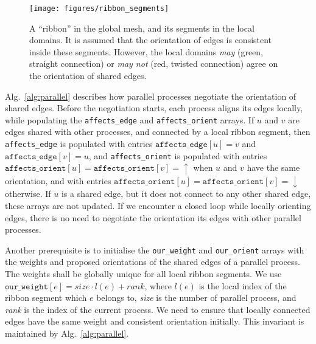 \documentclass[oneeqnum,onethmnum,onefignum,onetabnum]{siamltex1213}
\begin{document}
\begin{figure}
  \centering
  \texttt{[image: figures/ribbon\_segments]}

  \caption{A ``ribbon'' in the global mesh, and its segments in the
    local domains. It is assumed that the orientation of edges is
    consistent inside these segments. However, the local domains
    \emph{may} (green, straight connection) or \emph{may not}
    (red, twisted connection) agree on the
    orientation of shared edges.}
  \label{fig:ribbon_segments}
\end{figure}

Alg.~\ref{alg:parallel} describes how parallel processes negotiate the
orientation of shared edges. Before the negotiation starts, each
process aligns its edges locally, while populating the
\texttt{affects\_edge} and \texttt{affects\_orient} arrays.  If $ u $
and $ v $ are edges shared with other processes, and connected by a
local ribbon segment, then \texttt{affects\_edge} is populated with
entries $ \mathtt{affects\_edge}[u] = v $ and $
\mathtt{affects\_edge}[v] = u $, and \texttt{affects\_orient} is
populated with entries $ \mathtt{affects\_orient}[u] =
\mathtt{affects\_orient}[v] ={} \uparrow $ when $ u $ and $ v $ have
the same orientation, and with entries $ \mathtt{affects\_orient}[u] =
\mathtt{affects\_orient}[v] ={} \downarrow $ otherwise. If $ u $ is a
shared edge, but it does not connect to any other shared edge, these
arrays are not updated. If we encounter a closed loop while locally
orienting edges, there is no need to negotiate the orientation its
edges with other parallel processes.

Another prerequisite is to initialise the \texttt{our\_weight} and
\texttt{our\_orient} arrays with the weights and proposed orientations
of the shared edges of a parallel process. The weights shall be
globally unique for all local ribbon segments. We use $
\mathtt{our\_weight}[e] = \mathit{size} \cdot l(e) + \mathit{rank} $,
where $ l(e) $ is the local index of the ribbon segment which $ e $
belongs to, \textit{size} is the number of parallel process, and
\textit{rank} is the index of the current process. We need to ensure
that locally connected edges have the same weight and consistent
orientation initially. This invariant is maintained by
Alg.~\ref{alg:parallel}.
\end{document}
